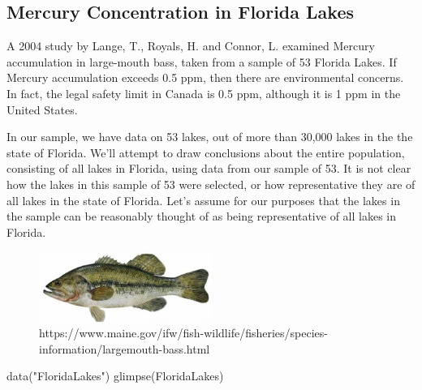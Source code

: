 \documentclass[
  letterpaper,
  DIV=11,
  numbers=noendperiod]{scrreprt}
\newenvironment{Shaded}{\begin{snugshade}}{\end{snugshade}}
\newcommand{\FunctionTok}[1]{\textcolor[rgb]{0.28,0.35,0.67}{#1}}
\newcommand{\NormalTok}[1]{\textcolor[rgb]{0.00,0.23,0.31}{#1}}
\newcommand{\StringTok}[1]{\textcolor[rgb]{0.13,0.47,0.30}{#1}}
\begin{document}
\subsection{Mercury Concentration in Florida
Lakes}\label{mercury-concentration-in-florida-lakes}

A 2004 study by Lange, T., Royals, H. and Connor, L. examined Mercury
accumulation in large-mouth bass, taken from a sample of 53 Florida
Lakes. If Mercury accumulation exceeds 0.5 ppm, then there are
environmental concerns. In fact, the legal safety limit in Canada is 0.5
ppm, although it is 1 ppm in the United States.

In our sample, we have data on 53 lakes, out of more than 30,000 lakes
in the the state of Florida. We'll attempt to draw conclusions about the
entire population, consisting of all lakes in Florida, using data from
our sample of 53. It is not clear how the lakes in this sample of 53
were selected, or how representative they are of all lakes in the state
of Florida. Let's assume for our purposes that the lakes in the sample
can be reasonably thought of as being representative of all lakes in
Florida.

\begin{figure}[H]

{\centering \includegraphics[width=0.5\textwidth,height=\textheight]{Bass.png}

}

\caption{https://www.maine.gov/ifw/fish-wildlife/fisheries/species-information/largemouth-bass.html}

\end{figure}%

\begin{Shaded}
\begin{Highlighting}[]
\FunctionTok{data}\NormalTok{(}\StringTok{"FloridaLakes"}\NormalTok{)}
\FunctionTok{glimpse}\NormalTok{(FloridaLakes)}
\end{Highlighting}
\end{Shaded}
\end{document}
